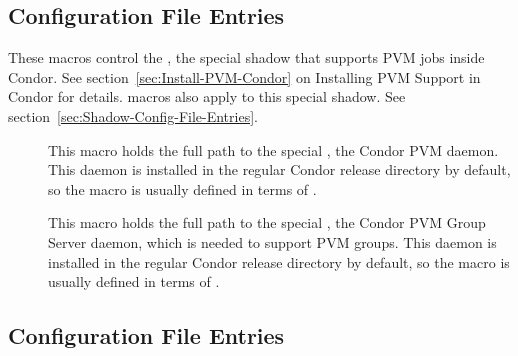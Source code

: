 \subsection{\label{sec:Shadow-PVM-Config-File-Entries}
 Configuration File Entries}

These macros control the , the special shadow
that supports PVM jobs inside Condor.  See
section~\ref{sec:Install-PVM-Condor} on Installing PVM Support in
Condor for details.   macros also apply to this
special shadow.  See section~\ref{sec:Shadow-Config-File-Entries}.
\begin{description}

\item[] \label{param:PvmD}  This macro holds the full path
  to the special , the Condor PVM daemon.  This daemon is
  installed in the regular Condor release directory by default, so the
  macro is usually defined in terms of .
  
\item[] \label{param:PvmGS} This macro holds the full
  path to the special , the Condor PVM Group Server
  daemon, which is needed to support PVM groups.  This daemon is
  installed in the regular Condor release directory by default, so the
  macro is usually defined in terms of .

\end{description}

\subsection{\label{sec:Starter-Config-File-Entries}
 Configuration File Entries}

